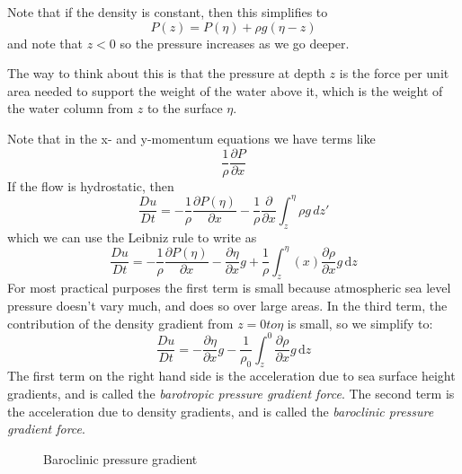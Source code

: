 Note that if the density is constant, then this simplifies to
\[ P(z) = P(\eta) + \rho g (\eta - z)\] and note that \(z<0\) so the
pressure increases as we go deeper.

The way to think about this is that the pressure at depth \(z\) is the
force per unit area needed to support the weight of the water above it,
which is the weight of the water column from \(z\) to the surface
\(\eta\).

Note that in the x- and y-momentum equations we have terms like
\[\frac{1}{\rho}\frac{\partial P}{\partial x}\] If the flow is
hydrostatic, then
\[\frac{Du}{Dt} = -\frac{1}{\rho}\frac{\partial P(\eta)}{\partial x} - \frac{1}{\rho}\frac{\partial}{\partial x} \int_z^{\eta} \rho g \, dz'\]
which we can use the Leibniz rule to write as
\[\frac{Du}{Dt} = -\frac{1}{\rho}\frac{\partial P(\eta)}{\partial x} - \frac{\partial \eta}{\partial x} g + \frac{1}{\rho}\int_z^\eta(x) \frac{\partial \rho}{\partial x} g\,\mathrm{d}z\]
For most practical purposes the first term is small because atmospheric
sea level pressure doesn't vary much, and does so over large areas. In
the third term, the contribution of the density gradient from
\(z=0 to \eta\) is small, so we simplify to:
\[\frac{Du}{Dt} = - \frac{\partial \eta}{\partial x} g - \frac{1}{\rho_0}\int_z^0 \frac{\partial \rho}{\partial x} g\,\mathrm{d}z\]
The first term on the right hand side is the acceleration due to sea
surface height gradients, and is called the \emph{barotropic pressure
gradient force}. The second term is the acceleration due to density
gradients, and is called the \emph{baroclinic pressure gradient force}.

\begin{figure}
\centering
{}
\caption{Baroclinic pressure gradient}
\end{figure}

